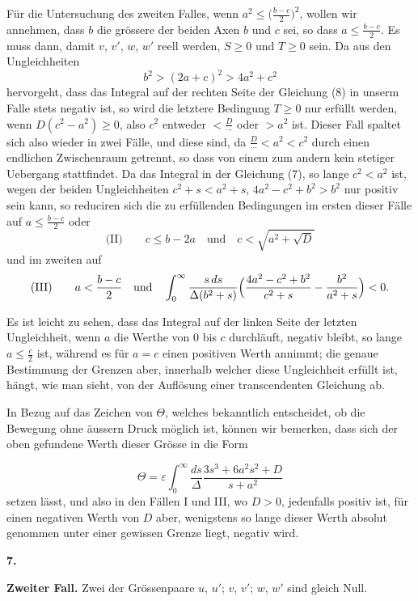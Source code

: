 \documentclass[12pt,a4paper]{article}
\begin{document}
F\"ur die Untersuchung des zweiten Falles, wenn $a^{2} \leq \bigl(\frac{b-c}{2}\bigr)^{2}$, wollen wir annehmen, dass $b$ die gr\"ossere der beiden Axen $b$ und $c$ sei, so dass $a \leq \frac{b-c}{2}$. Es muss dann, damit $v$, $v'$, $w$, $w'$ reell werden, $S \geq 0$ und $T \geq 0$ sein. Da aus den Ungleichheiten
\[
b^{2} > (2a+c)^{2} > 4a^{2} + c^{2}
\]
hervorgeht, dass das Integral auf der rechten Seite der Gleichung (8) in unserm Falle stets negativ ist, so wird die letztere Bedingung $T \geq 0$ nur erf\"ullt werden, wenn $D(c^{2} - a^{2}) \geq 0$, also $c^{2}$ entweder $< \frac{D}{\cdots}$ oder $> a^{2}$ ist. Dieser Fall spaltet sich also wieder in zwei F\"alle, und diese sind, da $\frac{D}{\cdots} < a^{2} < c^{2}$ durch einen endlichen Zwischenraum getrennt, so dass von einem zum andern kein stetiger Uebergang stattfindet. Da das Integral in der Gleichung (7), so lange $c^{2} < a^{2}$ ist, wegen der beiden Ungleichheiten $c^{2} + s < a^{2} + s$, $4a^{2} - c^{2} + b^{2} > b^{2}$ nur positiv sein kann, so reduciren sich die zu erf\"ullenden Bedingungen im ersten dieser F\"alle auf $a \leq \frac{b-c}{2}$ oder
\[
\text{(II)}\qquad c \leq b - 2a\quad\text{und}\quad c < \sqrt{a^{2} + \sqrt{D}}
\]
und im zweiten auf
\[
\text{(III)}\qquad a < \frac{b-c}{2}\quad\text{und}\quad\int_{0}^{\infty}\frac{s\,ds}{\Delta(b^{2}+s)}\Bigl(\frac{4a^{2}-c^{2}+b^{2}}{c^{2}+s} - \frac{b^{2}}{a^{2}+s}\Bigr) < 0.
\]

Es ist leicht zu sehen, dass das Integral auf der linken Seite der letzten Ungleichheit, wenn $a$ die Werthe von $0$ bis $c$ durchl\"auft, negativ bleibt, so lange $a \leq \frac{c}{2}$ ist, w\"ahrend es f\"ur $a = c$ einen positiven Werth annimmt; die genaue Bestimmung der Grenzen aber, innerhalb welcher diese Ungleichheit erf\"ullt ist, h\"angt, wie man sieht, von der Aufl\"osung einer transcendenten Gleichung ab.

In Bezug auf das Zeichen von $\Theta$, welches bekanntlich entscheidet, ob die Bewegung ohne \"aussern Druck m\"oglich ist, k\"onnen wir bemerken, dass sich der oben gefundene Werth dieser Gr\"osse in die Form

\[
\Theta = \varepsilon\int_{0}^{\infty}\frac{ds}{\Delta}\frac{3s^{3} + 6a^{2}s^{2} + D}{s + a^{2}}
\]
setzen l\"asst, und also in den F\"allen I und III, wo $D > 0$, jedenfalls positiv ist, f\"ur einen negativen Werth von $D$ aber, wenigstens so lange dieser Werth absolut genommen unter einer gewissen Grenze liegt, negativ wird.

\begin{center}
\textbf{7.}
\end{center}
\begin{center}
\textbf{Zweiter Fall.} Zwei der Gr\"ossenpaare $u$, $u'$; $v$, $v'$; $w$, $w'$ sind gleich Null.
\end{center}
\end{document}

